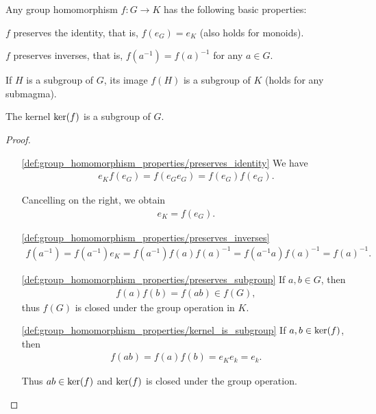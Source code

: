 \begin{proposition}\label{thm:group_homomorphism_properties}
  Any group homomorphism \( f: G \to K \) has the following basic properties:
  \begin{defenum}
    \item\label{def:group_homomorphism_properties/preserves_identity} \( f \) preserves the identity, that is, \( f(e_G) = e_K \) (also holds for monoids).
    \item\label{def:group_homomorphism_properties/preserves_inverses} \( f \) preserves inverses, that is, \( f(a^{-1}) = f(a)^{-1} \) for any \( a \in G \).
    \item\label{def:group_homomorphism_properties/preserves_subgroup} If \( H \) is a subgroup of \( G \), its image \( f(H) \) is a subgroup of \( K \) (holds for any submagma).
    \item\label{def:group_homomorphism_properties/kernel_is_subgroup} The kernel \( \operatorname{ker}(f) \) is a subgroup of \( G \).
  \end{defenum}
\end{proposition}
\begin{proof}\mbox{}
  \begin{itemize}
    \item[\ref{def:group_homomorphism_properties/preserves_identity}] We have
    \begin{align*}
      e_K f(e_G) = f(e_G e_G) = f(e_G) f(e_G).
    \end{align*}

    Cancelling on the right, we obtain
    \begin{align*}
      e_K = f(e_G).
    \end{align*}

    \item[\ref{def:group_homomorphism_properties/preserves_inverses}]
    \begin{align*}
      f(a^{-1})
      =
      f(a^{-1}) e_K
      =
      f(a^{-1}) f(a) f(a)^{-1}
      =
      f(a^{-1} a) f(a)^{-1}
      =
      f(a)^{-1}.
    \end{align*}

    \item[\ref{def:group_homomorphism_properties/preserves_subgroup}] If \( a, b \in G \), then
    \begin{align*}
      f(a) f(b) = f(ab) \in f(G),
    \end{align*}
    thus \( f(G) \) is closed under the group operation in \( K \).

    \item[\ref{def:group_homomorphism_properties/kernel_is_subgroup}] If \( a, b \in \operatorname{ker}(f) \), then
    \begin{align*}
      f(ab) = f(a) f(b) = e_K e_k = e_k.
    \end{align*}

    Thus \( ab \in \operatorname{ker}(f) \) and \( \operatorname{ker}(f) \) is closed under the group operation.
  \end{itemize}
\end{proof}

